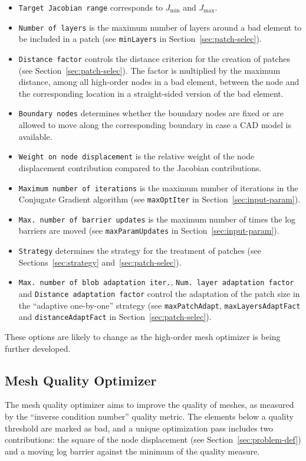 \documentclass[12pt,a4paper,a4wide]{article}
\begin{document}
\begin{itemize}
\item \texttt{Target Jacobian range} corresponds to $J_{\min}$ and
$J_{\max}$.
\item \texttt{Number of layers} is the maximum number of layers
around a bad element to be included in a patch (see \texttt{minLayers}
in Section~\ref{sec:patch-selec}).
\item \texttt{Distance factor} controls the distance criterion
for the creation of patches (see Section~\ref{sec:patch-selec}). The
factor is multiplied by the maximum distance, among all high-order
nodes in a bad element, between the node and the corresponding location
in a straight-sided version of the bad element.
\item \texttt{Boundary nodes} determines whether the boundary nodes
are fixed or are allowed to move along the corresponding boundary
in case a CAD model is available.
\item \texttt{Weight on node displacement} is the relative weight
of the node displacement contribution compared to the Jacobian
contributions.
\item \texttt{Maximum number of iterations} is the maximum number
of iterations in the Conjugate Gradient algorithm (see
\texttt{maxOptIter} in Section~\ref{sec:input-param}).
\item \texttt{Max. number of barrier updates} is the maximum number
of times the log barriers are moved (see \texttt{maxParamUpdates} in
Section~\ref{sec:input-param}).
\item \texttt{Strategy} determines the strategy for the treatment of
patches (see Sections~\ref{sec:strategy} and~\ref{sec:patch-selec}).
\item \texttt{Max. number of blob adaptation iter.},
\texttt{Num. layer adaptation factor} and
\texttt{Distance adaptation factor} control the adaptation of the
patch size in the ``adaptive one-by-one'' strategy (see
\texttt{maxPatchAdapt}, \texttt{maxLayersAdaptFact} and
\texttt{distanceAdaptFact} in Section~\ref{sec:patch-selec}).
\end{itemize}

These options are likely to change as the high-order mesh
optimizer is being further developed.


\subsection{Mesh Quality Optimizer}

The mesh quality optimizer aims to improve the quality of meshes,
as measured by the ``inverse condition number'' quality metric.
The elements below a quality threshold are marked as bad, and a
unique optimization pass includes two contributions: the square
of the node displacement (see Section~\ref{sec:problem-def}) and
a moving log barrier against the minimum of the quality measure.
\end{document}
